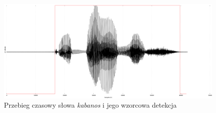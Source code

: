 \documentclass[eng,printmode]{mgr}
\begin{document}
	\begin{figure}
		\begin{center}
			\includegraphics[scale=0.2]{kabanos.png}
			\caption{Przebieg czasowy słowa \emph{kabanos} i jego wzorcowa detekcja}\vspace{5mm}
		\end{center}
	\end{figure}
\end{document}
